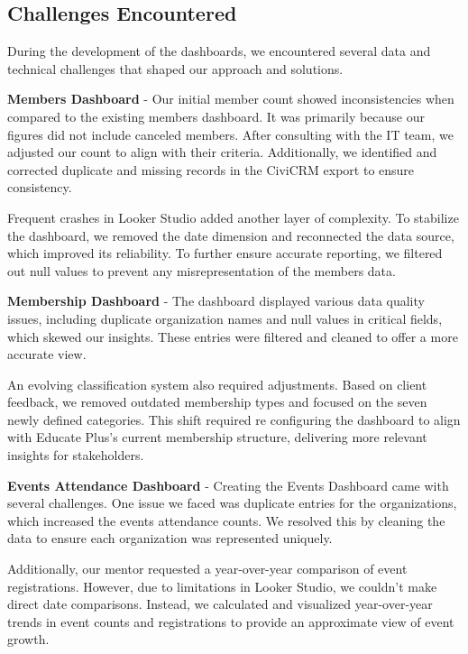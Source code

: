 \documentclass[11pt,a4paper,]{article}
\begin{document}
\subsection{Challenges Encountered}\label{challenges-encountered}

During the development of the dashboards, we encountered several data and technical challenges that shaped our approach and solutions.

\textbf{Members Dashboard} - Our initial member count showed inconsistencies when compared to the existing members dashboard. It was primarily because our figures did not include canceled members. After consulting with the IT team, we adjusted our count to align with their criteria. Additionally, we identified and corrected duplicate and missing records in the CiviCRM export to ensure consistency.

Frequent crashes in Looker Studio added another layer of complexity. To stabilize the dashboard, we removed the date dimension and reconnected the data source, which improved its reliability. To further ensure accurate reporting, we filtered out null values to prevent any misrepresentation of the members data.

\textbf{Membership Dashboard} - The dashboard displayed various data quality issues, including duplicate organization names and null values in critical fields, which skewed our insights. These entries were filtered and cleaned to offer a more accurate view.

An evolving classification system also required adjustments. Based on client feedback, we removed outdated membership types and focused on the seven newly defined categories. This shift required re configuring the dashboard to align with Educate Plus's current membership structure, delivering more relevant insights for stakeholders.

\textbf{Events Attendance Dashboard} - Creating the Events Dashboard came with several challenges. One issue we faced was duplicate entries for the organizations, which increased the events attendance counts. We resolved this by cleaning the data to ensure each organization was represented uniquely.

Additionally, our mentor requested a year-over-year comparison of event registrations. However, due to limitations in Looker Studio, we couldn't make direct date comparisons. Instead, we calculated and visualized year-over-year trends in event counts and registrations to provide an approximate view of event growth.
\end{document}
